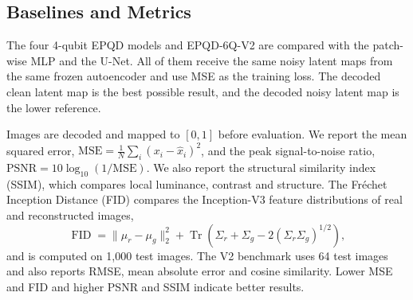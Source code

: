 \subsection{Baselines and Metrics}
The four 4-qubit EPQD models and EPQD-6Q-V2 are compared with the patch-wise MLP and the U-Net. All of them receive the same noisy latent maps from the same frozen autoencoder and use MSE as the training loss. The decoded clean latent map is the best possible result, and the decoded noisy latent map is the lower reference.

Images are decoded and mapped to $[0,1]$ before evaluation. We report the mean squared error, $\mathrm{MSE}=\frac{1}{N}\sum_i(x_i-\hat x_i)^2$, and the peak signal-to-noise ratio, $\mathrm{PSNR}=10\log_{10}(1/\mathrm{MSE})$. We also report the structural similarity index (SSIM), which compares local luminance, contrast and structure. The Fr\'echet Inception Distance (FID) compares the Inception-V3 feature distributions of real and reconstructed images,
\begin{equation}
    \operatorname{FID}=\|\mu_r-\mu_g\|_2^2+
    \operatorname{Tr}\!\left(\Sigma_r+\Sigma_g-2(\Sigma_r\Sigma_g)^{1/2}\right),
\end{equation}
and is computed on 1{,}000 test images. The V2 benchmark uses 64 test images and also reports RMSE, mean absolute error and cosine similarity. Lower MSE and FID and higher PSNR and SSIM indicate better results.
